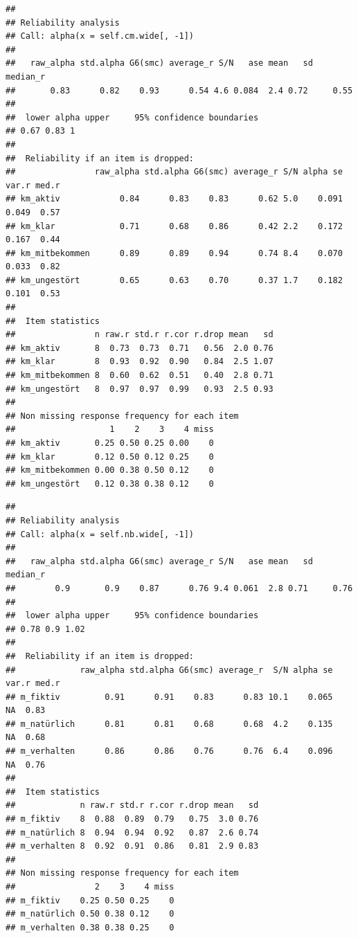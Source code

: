 \documentclass[
  english,
  man,floatsintext]{apa6}
\begin{document}
\begin{verbatim}
## 
## Reliability analysis   
## Call: alpha(x = self.cm.wide[, -1])
## 
##   raw_alpha std.alpha G6(smc) average_r S/N   ase mean   sd median_r
##       0.83      0.82    0.93      0.54 4.6 0.084  2.4 0.72     0.55
## 
##  lower alpha upper     95% confidence boundaries
## 0.67 0.83 1 
## 
##  Reliability if an item is dropped:
##                raw_alpha std.alpha G6(smc) average_r S/N alpha se var.r med.r
## km_aktiv            0.84      0.83    0.83      0.62 5.0    0.091 0.049  0.57
## km_klar             0.71      0.68    0.86      0.42 2.2    0.172 0.167  0.44
## km_mitbekommen      0.89      0.89    0.94      0.74 8.4    0.070 0.033  0.82
## km_ungestört        0.65      0.63    0.70      0.37 1.7    0.182 0.101  0.53
## 
##  Item statistics 
##                n raw.r std.r r.cor r.drop mean   sd
## km_aktiv       8  0.73  0.73  0.71   0.56  2.0 0.76
## km_klar        8  0.93  0.92  0.90   0.84  2.5 1.07
## km_mitbekommen 8  0.60  0.62  0.51   0.40  2.8 0.71
## km_ungestört   8  0.97  0.97  0.99   0.93  2.5 0.93
## 
## Non missing response frequency for each item
##                   1    2    3    4 miss
## km_aktiv       0.25 0.50 0.25 0.00    0
## km_klar        0.12 0.50 0.12 0.25    0
## km_mitbekommen 0.00 0.38 0.50 0.12    0
## km_ungestört   0.12 0.38 0.38 0.12    0
\end{verbatim}

\begin{verbatim}
## 
## Reliability analysis   
## Call: alpha(x = self.nb.wide[, -1])
## 
##   raw_alpha std.alpha G6(smc) average_r S/N   ase mean   sd median_r
##        0.9       0.9    0.87      0.76 9.4 0.061  2.8 0.71     0.76
## 
##  lower alpha upper     95% confidence boundaries
## 0.78 0.9 1.02 
## 
##  Reliability if an item is dropped:
##             raw_alpha std.alpha G6(smc) average_r  S/N alpha se var.r med.r
## m_fiktiv         0.91      0.91    0.83      0.83 10.1    0.065    NA  0.83
## m_natürlich      0.81      0.81    0.68      0.68  4.2    0.135    NA  0.68
## m_verhalten      0.86      0.86    0.76      0.76  6.4    0.096    NA  0.76
## 
##  Item statistics 
##             n raw.r std.r r.cor r.drop mean   sd
## m_fiktiv    8  0.88  0.89  0.79   0.75  3.0 0.76
## m_natürlich 8  0.94  0.94  0.92   0.87  2.6 0.74
## m_verhalten 8  0.92  0.91  0.86   0.81  2.9 0.83
## 
## Non missing response frequency for each item
##                2    3    4 miss
## m_fiktiv    0.25 0.50 0.25    0
## m_natürlich 0.50 0.38 0.12    0
## m_verhalten 0.38 0.38 0.25    0
\end{verbatim}
\end{document}
